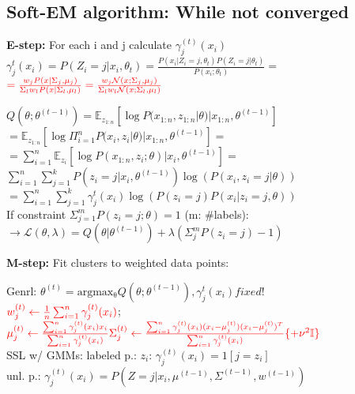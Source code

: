 \subsection*{Soft-EM algorithm: While not converged}
\textbf{E-step:} For each i and j calculate $\gamma_j^{(t)}(x_i)$\\
$\gamma_j^t(x_i) = P(Z_i=j|x_i, \theta_t) = \frac{P(x_i|Z_i=j, \theta_t) P(Z_i=j|\theta_t)}{P(x_i;\theta_t)}=$\\
$\color{red} =\frac{w_j P(x|\Sigma_j,\mu_j)}{\Sigma_l w_l P(x|\Sigma_l,\mu_l)}  
=\frac{w_j \mathcal{N}(x;\Sigma_j,\mu_j)}{\Sigma_l w_l \mathcal{N}(x;\Sigma_l,\mu_l)}$


$Q(\theta;\theta^{(t-1)})=\mathbb{E}_{z_{1:n}}[\log P(x_{1:n},z_{1:n}|\theta)|x_{1:n},\theta^{(t-1)}]$ 
$=\mathbb{E}_{z_{1:n}}[\log \Pi_{i=1}^nP(x_i,z_i|\theta)|x_{1:n},\theta^{(t-1)}]=$ \\
$=\sum_{i=1}^n \mathbb{E}_{z_i}[\log P(x_{1:n},z_i;\theta)|x_i,\theta^{(t-1)}] = $ \\
$\sum_{i=1}^n \sum_{j=1}^k P(z_i=j|x_i,\theta^{(t-1)})\log (P(x_i,z_i=j|\theta) )$ \\
$=\sum_{i=1}^n \sum_{j=1}^k \gamma_{j}^t(x_i) \log (P(z_i=j)P(x_i|z_i=j, \theta) )$ \\
If constraint $\Sigma_{j=1}^m P(z_i=j;\theta)=1$ (m: \#labels):
$\rightarrow \mathcal{L}(\theta,\lambda)=Q(\theta|\theta^{(t-1)})+
\lambda(\Sigma_j^mP(z_i=j)-1) $


\textbf{M-step:} Fit clusters to weighted data points:

Genrl: $\theta^{(t)} = \operatorname{argmax_\theta} Q(\theta;\theta^{(t-1)}), \gamma_{j}^t(x_i) fixed!$\\
$\color{red} w_j^{(t)} \leftarrow \frac{1}{n} \sum_{i=1}^n \gamma_j^{(t)} (x_i)$;  %
$\color{red} \mu_j^{(t)} \leftarrow \frac{\sum_{i=1}^n \gamma_j^{(t)} (x_i) x_i}{\sum_{i=1}^n \gamma_j^{(t)} (x_i)}\\ %
\Sigma_j^{(t)} \leftarrow \frac{\sum_{i=1}^n \gamma_j^{(t)}(x_i) (x_i - \mu_j^{(t)}) (x_i - \mu_j^{(t)})^T}{\sum_{i=1}^n \gamma_j^{(t)}(x_i)} \{+\nu^2\mathbb{I}\}$\\ %

SSL w/ GMMs: labeled p.: $z_i$: $\gamma_j^{(t)}(x_i) = 1[j = z_i]$\\
unl. p.: $\gamma_j^{(t)}(x_i) = P(Z=j|x_i, \mu^{(t-1)}, \Sigma^{(t-1)}, w^{(t-1)})$

